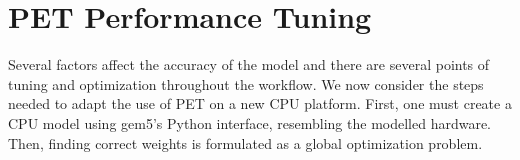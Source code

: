 \chapter{PET Performance Tuning}

Several factors affect the accuracy of the model and there are several points of
tuning and optimization throughout the workflow. We now consider the steps
needed to adapt the use of PET on a new CPU platform. First, one must create a
CPU model using gem5's Python interface, resembling the modelled hardware. Then,
finding correct weights is formulated as a global optimization problem.







